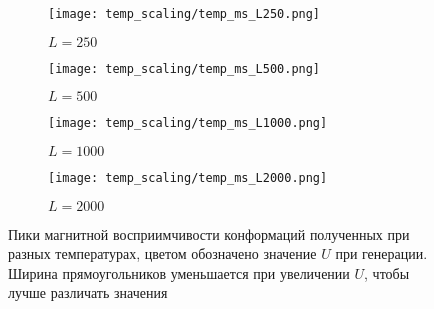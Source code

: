 \begin{figure}[ht]
	\centering
    \begin{subfigure}[t]{0.4\textwidth}
        \texttt{[image: temp\_scaling/temp\_ms\_L250.png]}
        \caption*{$L = 250$}
    \end{subfigure} 
    \begin{subfigure}[t]{0.4\textwidth}
        \texttt{[image: temp\_scaling/temp\_ms\_L500.png]}
        \caption*{$L = 500$}

    \end{subfigure}
    \begin{subfigure}[t]{0.4\textwidth}
        \texttt{[image: temp\_scaling/temp\_ms\_L1000.png]}
        \caption*{$L = 1000$}
    \end{subfigure}
    \begin{subfigure}[t]{0.4\textwidth}
        \texttt{[image: temp\_scaling/temp\_ms\_L2000.png]}
        \caption*{$L = 2000$}
    \end{subfigure}
	\caption{Пики магнитной восприимчивости конформаций полученных при разных температурах, цветом обозначено значение $U$ при генерации. Ширина прямоугольников уменьшается при увеличении $U$, чтобы лучше различать значения}
	\label{fig:temp_scaling_ms}
\end{figure}


\begin{figure}[ht]
    \centering
    \begin{subfigure}{0.4\textwidth}
        \resizebox{\textwidth}{!}{}
    \end{subfigure}
    \begin{subfigure}{0.4\textwidth}
        \resizebox{\textwidth}{!}{}
    \end{subfigure}
\end{figure}
